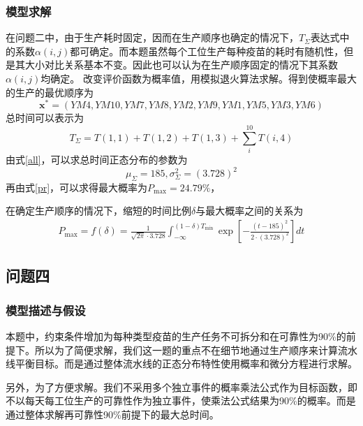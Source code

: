 \documentclass[UTF8]{ctexart}
\begin{document}
	\subsubsection{模型求解}
	在问题二中，由于生产耗时固定，因而在生产顺序也确定的情况下，$T_{\Sigma}$表达式中的系数$\alpha(i,j)$都可确定。而本题虽然每个工位生产每种疫苗的耗时有随机性，但是其大小对比关系基本不变。因此也可以认为在生产顺序固定的情况下其系数$\alpha(i,j)$均确定。
	改变评价函数为概率值，用模拟退火算法求解。得到使概率最大的生产的最优顺序为
	\begin{equation}
		\boldsymbol{x}^{*}=(YM4,YM10,YM7,YM8,YM2,YM9,YM1,YM5,YM3,YM6)
	\end{equation}
	总时间可以表示为
	\begin{equation}
		T_{\Sigma}=T(1,1)+T(1,2)+T(1,3)+\sum_{i}^{10}T(i,4)
	\end{equation}
	由式\ref{all}，可以求总时间正态分布的参数为
	\begin{equation}
		\mu_{\Sigma}=185,\sigma_{\Sigma}^{2}=(3.728)^2
	\end{equation}
	再由式\ref{pr}，可以求得最大概率为$P_{\max}=24.79\%$，
	\par 在确定生产顺序的情况下，缩短的时间比例$\delta$与最大概率之间的关系为
	\begin{equation}
	\begin{split}
		P_{\max}=f(\delta)=\frac{1}{\sqrt{2\pi}\cdot3.728}\int^{(1-\delta)T_{\min}}_{-\infty}\exp[{-\frac{(t-185)^2}{2\cdot(3.728)^2}}]dt
	\end{split}
	\end{equation}
	
	\subsection{问题四}
	\subsubsection{模型描述与假设}
	本题中，约束条件增加为每种类型疫苗的生产任务不可拆分和在可靠性为90\%的前提下。所以为了简便求解，我们这一题的重点不在细节地通过生产顺序来计算流水线平衡目标。而是通过整体流水线的正态分布特性使用概率和微分方程进行求解。
	
	另外，为了方便求解。我们不采用多个独立事件的概率乘法公式作为目标函数，即不以每天每工位生产的可靠性作为独立事件，使乘法公式结果为90\%的概率。而是通过整体求解再可靠性90\%前提下的最大总时间。
\end{document}
